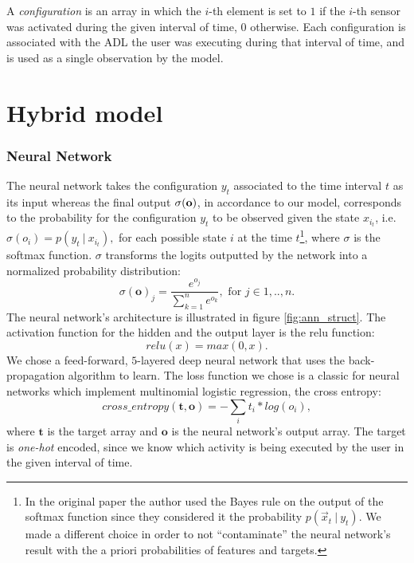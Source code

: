 \documentclass[10pt,a4paper]{article}
\begin{document}
	
	A \textit{configuration}  is an array in which the $i$-th element is set to $1$ if the $i$-th sensor was activated during the given interval of time, 0 otherwise. Each configuration is associated with the ADL the user was executing during that interval of time, and is used as a single observation by the model.
	
	
	\section{Hybrid model}
	\subsubsection{Neural Network}
	The neural network takes the configuration $y_t$ associated to the time interval $t$ as its input whereas the final output $\sigma(\bf o \rm)$, in accordance to our model, corresponds to the probability for the configuration $y_t$ to be observed given the state $x_{i_t}$, i.e. $\sigma(o_i) = p( y_t\ |\ x_{i_t}),$ for each possible state $i$ at the time $t$\footnote{In the original paper  the author used the Bayes rule on the output of the softmax function \cite{DBLP:journals/eswa/OrdonezITLS13} since they considered it the probability $p(\vec x_t\ |\ y_t)$. We made a different choice in order to not ``contaminate'' the neural network's result with the a priori probabilities of features and targets.}, where $\sigma$ is the softmax function. $\sigma$ transforms the logits outputted by the network into a normalized probability distribution: $$\sigma(\textbf{o})_j = \frac{e^{o_j}}{\sum_{k=1}^{n} e^{o_k}}, \text{ for } j \in 1,..,n.$$The neural network's architecture is illustrated in figure \ref{fig:ann_struct}. The activation function for the hidden and the output layer is the relu function: $$relu(x)=max(0, x).$$  
	We chose a feed-forward, $5$-layered deep neural network that uses the back-propagation algorithm to learn. The loss function we chose is a classic for neural networks which implement multinomial logistic regression, the cross entropy:
	$$cross\_entropy(\textbf{t}, \textbf{o}) = - \sum_{i}t_i * log(o_i),$$ where $\textbf{t}$ is the target array and $\textbf{o}$ is the neural network's output array. The target is \textit{one-hot} encoded, since we know which activity is being executed by the user in the given interval of time.
	
\end{document}
